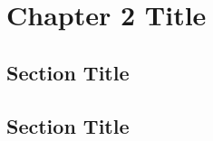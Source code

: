 \documentclass[../main.tex]{subfiles}
\begin{document}
\newpage
\doublespacing
\setcounter{chapter}{1}
\thesischapterstyle
\thispagestyle{empty}

\chapter{Chapter 2 Title}\label{chap2:short-label}

\section{Section Title}
\lipsum[1]

\section{Section Title}
\lipsum[2]
\end{document}

